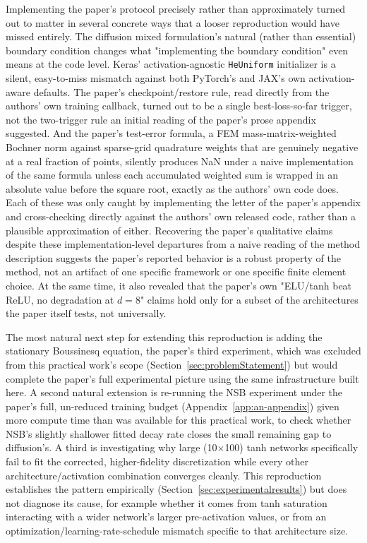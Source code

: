 Implementing the paper's protocol precisely rather than approximately
turned out to matter in several concrete ways that a looser reproduction
would have missed entirely. The diffusion mixed formulation's natural
(rather than essential) boundary condition changes what "implementing the
boundary condition" even means at the code level. Keras'
activation-agnostic \texttt{HeUniform} initializer is a silent, easy-to-miss
mismatch against both PyTorch's and JAX's own activation-aware defaults.
The paper's checkpoint/restore rule, read directly from the authors' own
training callback, turned out to be a single best-loss-so-far trigger, not
the two-trigger rule an initial reading of the paper's prose appendix
suggested. And the paper's test-error formula, a FEM mass-matrix-weighted
Bochner norm against sparse-grid quadrature weights that are genuinely
negative at a real fraction of points, silently produces NaN under a
naive implementation of the same formula unless each accumulated weighted
sum is wrapped in an absolute value before the square root, exactly as the
authors' own code does. Each of these was only caught by implementing the
letter of the paper's appendix and cross-checking directly against the
authors' own released code, rather than a plausible approximation of
either. Recovering the paper's qualitative claims despite these
implementation-level departures from a naive reading of the method
description suggests the paper's reported behavior is a robust property of
the method, not an artifact of one specific framework or one specific
finite element choice. At the same time, it also revealed that the
paper's own "ELU/tanh beat ReLU, no degradation at $d=8$" claims hold only
for a subset of the architectures the paper itself tests, not universally.

The most natural next step for extending this reproduction is adding the
stationary Boussinesq equation, the paper's third experiment, which was
excluded from this practical work's scope
(Section~\ref{sec:problemStatement}) but would complete the paper's full
experimental picture using the same infrastructure built here. A second
natural extension is re-running the NSB experiment under the paper's full,
un-reduced training budget (Appendix~\ref{app:an-appendix}) given more
compute time than was available for this practical work, to check whether
NSB's slightly shallower fitted decay rate closes the small remaining gap
to diffusion's. A third is investigating why large (10$\times$100) tanh
networks specifically fail to fit the corrected, higher-fidelity
discretization while every other architecture/activation combination
converges cleanly. This reproduction establishes the pattern empirically
(Section~\ref{sec:experimentalresults}) but does not diagnose its cause,
for example whether it comes from tanh saturation interacting with a
wider network's larger pre-activation values, or from an
optimization/learning-rate-schedule mismatch specific to that architecture
size.

